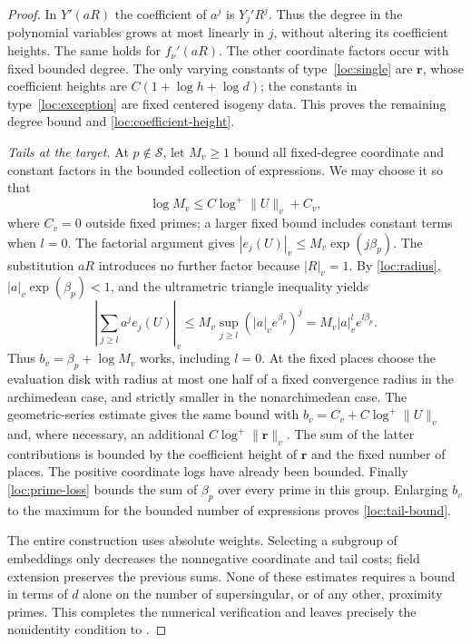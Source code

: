 \begin{proof}
In $Y'(aR)$ the coefficient of $a^j$ is $Y_j'R^j$.  Thus the degree
in the polynomial variables grows at most linearly in $j$, without
altering its coefficient heights.  The same holds for $f_\nu'(aR)$.
The other coordinate factors occur with fixed bounded degree.  The
only varying constants of type~\eqref{loc:single} are $\mathbf r$,
whose coefficient heights are $C(1+\log h+\log d)$; the constants in
type~\eqref{loc:exception} are fixed centered isogeny data.  This
proves the remaining degree bound and
\eqref{loc:coefficient-height}.

\emph{Tails at the target.}
At $p\notin\mathcal S$, let $M_v\geq1$ bound all fixed-degree
coordinate and constant factors in the bounded collection of
expressions.  We may choose it so that
\[
 \log M_v\leq C\log^+\|U\|_v+C_v,
\]
where $C_v=0$ outside fixed primes; a larger fixed bound includes
constant terms when $l=0$.  The factorial argument gives
$|e_j(U)|_v\leq M_v\exp(j\beta_p)$.  The substitution $aR$ introduces
no further factor because $|R|_v=1$.  By
\eqref{loc:radius}, $|a|_v\exp(\beta_p)<1$, and the ultrametric
triangle inequality yields
\[
 \left|\sum_{j\geq l}a^j e_j(U)\right|_v
 \leq M_v\sup_{j\geq l}(|a|_v e^{\beta_p})^j
 =M_v|a|_v^l e^{l\beta_p}.
\]
Thus $b_v=\beta_p+\log M_v$ works, including $l=0$.
At the fixed places choose the evaluation disk with radius at most
one half of a fixed convergence radius in the archimedean case, and
strictly smaller in the nonarchimedean case.  The geometric-series
estimate gives the same bound with
$b_v=C_v+C\log^+\|U\|_v$ and, where necessary, an additional
$C\log^+\|\mathbf r\|_v$.  The sum of the latter contributions is
bounded by the coefficient height of $\mathbf r$ and the fixed number
of places.  The positive coordinate logs have already been bounded.
Finally \eqref{loc:prime-loss} bounds the sum of $\beta_p$ over every
prime in this group.  Enlarging $b_v$ to the maximum for the bounded
number of expressions proves \eqref{loc:tail-bound}.

The entire construction uses absolute weights.  Selecting a subgroup
of embeddings only decreases the nonnegative coordinate and tail
costs; field extension preserves the previous sums.  None of these
estimates requires a bound in terms of $d$ alone on the number of
supersingular, or of any other, proximity primes.  This completes the
numerical verification and leaves precisely the nonidentity condition
to .
\end{proof}
